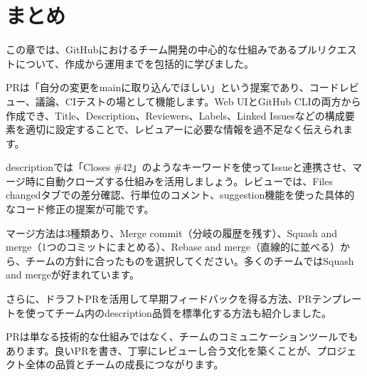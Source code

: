 \section{まとめ}

この章では、GitHubにおけるチーム開発の中心的な仕組みであるプルリクエストについて、作成から運用までを包括的に学びました。

PRは「自分の変更をmainに取り込んでほしい」という提案であり、コードレビュー、議論、CIテストの場として機能します。Web UIとGitHub CLIの両方から作成でき、Title、Description、Reviewers、Labels、Linked Issuesなどの構成要素を適切に設定することで、レビュアーに必要な情報を過不足なく伝えられます。

descriptionでは「Closes \#42」のようなキーワードを使ってIssueと連携させ、マージ時に自動クローズする仕組みを活用しましょう。レビューでは、Files changedタブでの差分確認、行単位のコメント、suggestion機能を使った具体的なコード修正の提案が可能です。

マージ方法は3種類あり、Merge commit（分岐の履歴を残す）、Squash and merge（1つのコミットにまとめる）、Rebase and merge（直線的に並べる）から、チームの方針に合ったものを選択してください。多くのチームではSquash and mergeが好まれています。

さらに、ドラフトPRを活用して早期フィードバックを得る方法、PRテンプレートを使ってチーム内のdescription品質を標準化する方法も紹介しました。

PRは単なる技術的な仕組みではなく、チームのコミュニケーションツールでもあります。良いPRを書き、丁寧にレビューし合う文化を築くことが、プロジェクト全体の品質とチームの成長につながります。
